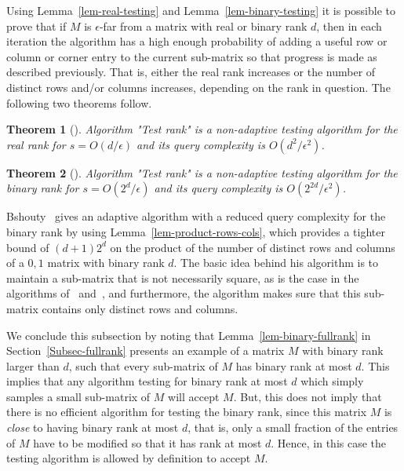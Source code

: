 \documentclass[11pt]{article}
\newtheorem{theorem}{Theorem}
\begin{document}
{{Using Lemma~\ref{lem-real-testing} and Lemma~\ref{lem-binary-testing} it is possible to prove that if $M$ is $\epsilon$-far from a matrix with real or binary rank $d$,
then in each iteration the algorithm has a high enough probability of adding a useful row or column or corner entry to the current sub-matrix so that progress is made as described previously.
That is, either the real rank increases or the number of distinct rows and/or columns increases, depending on the rank in question.
The following two theorems follow.

\begin{theorem}[\cite{krauthgamer2003property}]
Algorithm "Test rank" is a non-adaptive testing algorithm for the real rank for $s = O(d/\epsilon)$ and its query complexity is $O(d^2 /\epsilon^2)$.
\end{theorem}

\begin{theorem}[\cite{parnas2021property}]
Algorithm "Test rank" is a non-adaptive testing algorithm for the binary rank for $s = O(2^d/\epsilon)$ and its query complexity is $O(2^{2d} /\epsilon^2)$.
\end{theorem}

Bshouty~\cite{bshouty2023property} gives an adaptive algorithm with a reduced query complexity for the binary rank by using
Lemma~\ref{lem-product-rows-cols}, which provides a tighter bound of $(d+1)2^d$ on the product of the number of distinct rows and columns of a $0,1$ matrix with binary rank $d$.
The basic idea behind his algorithm is to maintain a sub-matrix that is not necessarily square, as is the case in the algorithms of~\cite{krauthgamer2003property}
and~\cite{parnas2021property}, and furthermore, the algorithm makes sure that this sub-matrix contains only distinct rows and columns.

We conclude this subsection by noting that Lemma~\ref{lem-binary-fullrank} in Section~\ref{Subsec-fullrank}
presents an example of a matrix $M$ with binary rank larger than $d$, such that every sub-matrix of $M$ has binary rank at most $d$.
This implies that any algorithm testing for binary rank at most $d$ which simply samples a small sub-matrix of $M$ will accept $M$.
But, this does not imply that there is no efficient algorithm for testing the binary rank,
since this matrix $M$ is  {\em close} to having binary rank at most $d$, that is,
only a small fraction of the entries of $M$ have to be modified so that it has rank at most $d$.
Hence, in this case the testing algorithm is allowed by definition to accept $M$.

}}
\end{document}

